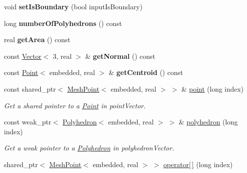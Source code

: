 \begin{DoxyCompactItemize}
\item 
void {\bfseries set\+Is\+Boundary} (bool input\+Is\+Boundary)\hypertarget{class_polygon_ab1dd3c0dbe875da0e34e16e4b37f8ab0}{}\label{class_polygon_ab1dd3c0dbe875da0e34e16e4b37f8ab0}

\item 
long {\bfseries number\+Of\+Polyhedrons} () const \hypertarget{class_polygon_ac5c64f6a2369301bf7f542c0543798f0}{}\label{class_polygon_ac5c64f6a2369301bf7f542c0543798f0}

\item 
real {\bfseries get\+Area} () const \hypertarget{class_polygon_a12cd12e47dd6b7d7ea0fd7fb10db4eed}{}\label{class_polygon_a12cd12e47dd6b7d7ea0fd7fb10db4eed}

\item 
const \hyperlink{class_point}{Vector}$<$ 3, real $>$ \& {\bfseries get\+Normal} () const \hypertarget{class_polygon_a3c6b41daa52625ae8fc00517b4876032}{}\label{class_polygon_a3c6b41daa52625ae8fc00517b4876032}

\item 
const \hyperlink{class_point}{Point}$<$ embedded, real $>$ \& {\bfseries get\+Centroid} () const \hypertarget{class_polygon_a8e4e62c641a9b6bee472d0e066680e08}{}\label{class_polygon_a8e4e62c641a9b6bee472d0e066680e08}

\item 
const shared\+\_\+ptr$<$ \hyperlink{class_mesh_point}{Mesh\+Point}$<$ embedded, real $>$ $>$ \& \hyperlink{class_polygon_a56f83109c9c8ad214f41bd8036efb32c}{point} (long index)\hypertarget{class_polygon_a56f83109c9c8ad214f41bd8036efb32c}{}\label{class_polygon_a56f83109c9c8ad214f41bd8036efb32c}

\begin{DoxyCompactList}\small\item\em Get a shared pointer to a \hyperlink{class_point}{Point} in point\+Vector. \end{DoxyCompactList}\item 
const weak\+\_\+ptr$<$ \hyperlink{class_polyhedron}{Polyhedron}$<$ embedded, real $>$ $>$ \& \hyperlink{class_polygon_a57bfc8000b2c43678fcc5841252f744d}{polyhedron} (long index)\hypertarget{class_polygon_a57bfc8000b2c43678fcc5841252f744d}{}\label{class_polygon_a57bfc8000b2c43678fcc5841252f744d}

\begin{DoxyCompactList}\small\item\em Get a weak pointer to a \hyperlink{class_polyhedron}{Polyhedron} in polyhedron\+Vector. \end{DoxyCompactList}\item 
shared\+\_\+ptr$<$ \hyperlink{class_mesh_point}{Mesh\+Point}$<$ embedded, real $>$ $>$ \hyperlink{class_polygon_aeca77478436766b314a6dee946f28ad4}{operator\mbox{[}$\,$\mbox{]}} (long index)\hypertarget{class_polygon_aeca77478436766b314a6dee946f28ad4}{}\label{class_polygon_aeca77478436766b314a6dee946f28ad4}


\end{DoxyCompactItemize}
